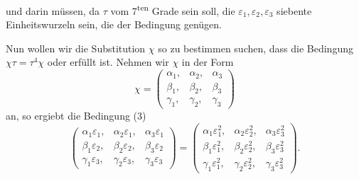 und darin müssen, da $\tau$ vom 7\textsuperscript{ten} Grade sein soll, die $\varepsilon_1, \varepsilon_2, \varepsilon_3$
siebente Einheitswurzeln sein, die der Bedingung
genügen.

Nun wollen wir die Substitution $\chi$ so zu bestimmen suchen,
dass die Bedingung $\chi \tau = \tau^4 \chi$ oder
erfüllt ist. Nehmen wir $\chi$ in der Form
\[
\chi = \begin{pmatrix} \alpha_1, & \alpha_2, & \alpha_3 \\ \beta_1, & \beta_2, & \beta_3 \\ \gamma_1, & \gamma_2, & \gamma_3 \end{pmatrix}
\]
an, so ergiebt die Bedingung (3)
\[
\begin{pmatrix} \alpha_1 \varepsilon_1, & \alpha_2 \varepsilon_1, & \alpha_3 \varepsilon_1 \\ \beta_1 \varepsilon_2, & \beta_2 \varepsilon_2, & \beta_3 \varepsilon_2 \\ \gamma_1 \varepsilon_3, & \gamma_2 \varepsilon_3, & \gamma_3 \varepsilon_3 \end{pmatrix}
=
\begin{pmatrix} \alpha_1 \varepsilon_1^2, & \alpha_2 \varepsilon_2^2, & \alpha_3 \varepsilon_3^2 \\ \beta_1 \varepsilon_1^2, & \beta_2 \varepsilon_2^2, & \beta_3 \varepsilon_3^2 \\ \gamma_1 \varepsilon_1^2, & \gamma_2 \varepsilon_2^2, & \gamma_3 \varepsilon_3^2 \end{pmatrix}.
\]

